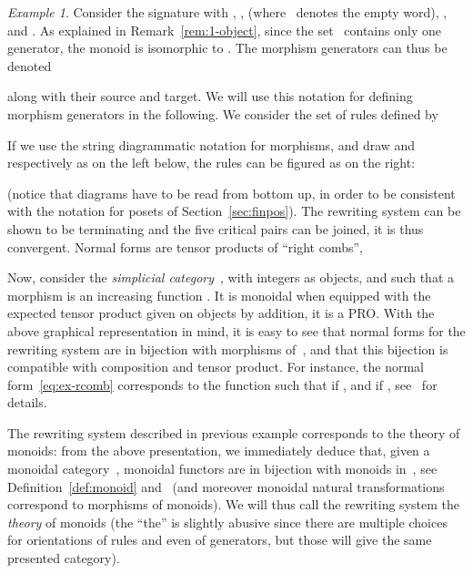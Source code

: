 \documentclass[submission,copyright,creativecommons]{eptcs}
\theoremstyle{definition}
\theoremstyle{remark}
\newtheorem{example}[theorem]{Example}
\begin{document}
\begin{example}
  \label{ex:pres-moncat}
  Consider the signature  with
  , , 
  (where~ denotes the empty word), , and
  . As explained in Remark~\ref{rem:1-object}, since the
  set~ contains only one generator, the monoid  is
  isomorphic to . The morphism generators can thus be denoted
  
  along with their source and target. We will use this notation for defining
  morphism generators in the following. We consider the set of rules defined by
  
  If we use the string diagrammatic notation for morphisms, and draw  and
   respectively as on the left below, the rules can be figured as on the
  right:
  
  (notice that diagrams have to be read from bottom up, in order to be
  consistent with the notation for posets of Section~\ref{sec:finpos}). The
  rewriting system can be shown to be terminating and the five critical pairs
  can be joined, it is thus convergent. Normal forms are tensor products of
  ``right combs'', \eg
  
  Now, consider the \emph{simplicial category}~, with integers as
  objects, and such that a morphism  is an increasing function
  . It is monoidal when equipped with the expected tensor product
  given on objects by addition, \ie it is a PRO. With the above graphical
  representation in mind, it is easy to see that normal forms for the rewriting
  system are in bijection with morphisms of~, and that this bijection is
  compatible with composition and tensor product. For instance, the normal
  form~\eqref{eq:ex-rcomb} corresponds to the function  such that
   if , and  if ,
  see~\cite{lafont2003towards, mimram:trt} for details.
\end{example}

The rewriting system described in previous example corresponds to the theory of
monoids: from the above presentation, we immediately deduce that, given a
monoidal category~, monoidal functors  are in bijection with
monoids in~, see Definition~\ref{def:monoid} and~\cite{maclane:cwm} (and
moreover monoidal natural transformations correspond to morphisms of
monoids). We will thus call the rewriting system the \emph{theory} of monoids
(the ``the'' is slightly abusive since there are multiple choices for
orientations of rules and even of generators, but those will give the same
presented category).
\end{document}
